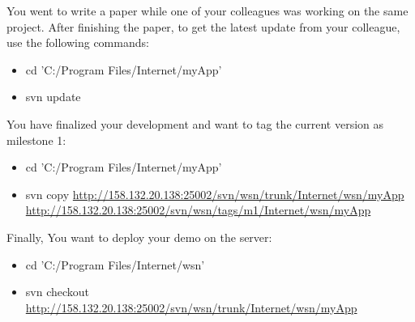 You went to write a paper while one of your colleagues was working on the same project. After finishing the paper, to get the latest update from your colleague, use the following commands:
\begin{itemize}
\item cd 'C:/Program Files/Internet/myApp'
\item svn update
\end{itemize}

You have finalized your development and want to tag the current version as milestone 1:
\begin{itemize}
\item cd 'C:/Program Files/Internet/myApp'
\item svn copy \url{http://158.132.20.138:25002/svn/wsn/trunk/Internet/wsn/myApp} \url{http://158.132.20.138:25002/svn/wsn/tags/m1/Internet/wsn/myApp}
\end{itemize}

Finally, You want to deploy your demo on the server:
\begin{itemize}
\item cd 'C:/Program Files/Internet/wsn'
\item svn checkout \url{http://158.132.20.138:25002/svn/wsn/trunk/Internet/wsn/myApp}
\end{itemize}